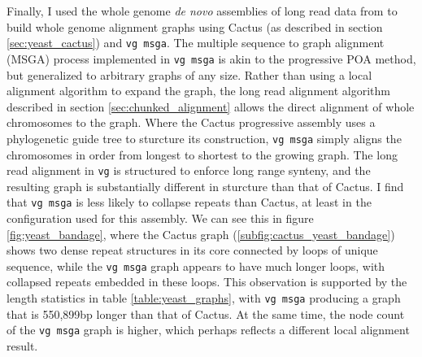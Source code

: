 Finally, I used the whole genome \emph{de novo} assemblies of long read data from \cite{yue2017contrasting} to build whole genome alignment graphs using Cactus (as described in section \ref{sec:yeast_cactus}) and {\tt vg msga}.
The multiple sequence to graph alignment (MSGA) process implemented in {\tt vg msga} is akin to the progressive POA method, but generalized to arbitrary graphs of any size.
Rather than using a local alignment algorithm to expand the graph, the long read alignment algorithm described in section \ref{sec:chunked_alignment} allows the direct alignment of whole chromosomes to the graph.
Where the Cactus progressive assembly uses a phylogenetic guide tree to sturcture its construction, {\tt vg msga} simply aligns the chromosomes in order from longest to shortest to the growing graph.
The long read alignment in {\tt vg} is structured to enforce long range synteny, and the resulting graph is substantially different in sturcture than that of Cactus.
I find that {\tt vg msga} is less likely to collapse repeats than Cactus, at least in the configuration used for this assembly.
We can see this in figure \ref{fig:yeast_bandage}, where the Cactus graph (\ref{subfig:cactus_yeast_bandage}) shows two dense repeat structures in its core connected by loops of unique sequence, while the {\tt vg msga} graph appears to have much longer loops, with collapsed repeats embedded in these loops.
This observation is supported by the length statistics in table \ref{table:yeast_graphs}, with {\tt vg msga} producing a graph that is 550,899bp longer than that of Cactus.
At the same time, the node count of the {\tt vg msga} graph is higher, which perhaps reflects a different local alignment result.

